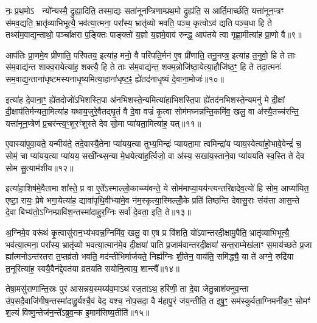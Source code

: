 नः॒ प्र॒थ॒मो\-ऽ  न्यो᳚न्यस्मै॒ द्रुह्या॒दिति॒ तस्मा॒द्यः सता॑नूनप्त्रिणाम्प्रथ॒मो द्रुह्य॑ति॒ स आर्ति॒मार्च्छ॑ति॒ यत्ता॑नून॒प्त्रꣳ स॑मव॒द्यति॒ भ्रातृ॑व्याभिभूत्यै॒ भव॑त्या॒त्मना॒ परा᳚स्य॒ भ्रातृ॑व्यो भवति॒ पञ्च॒ कृत्वो\-ऽव॑ द्यति पञ्च॒धा हि ते तथ्स॑म॒वाद्य॒न्ताथो॒ पञ्चा᳚क्षरा प॒ङ्क्तिः पाङ्क्तो॑ य॒ज्ञो य॒ज्ञमे॒वाव॑ रुन्द्ध॒ आप॑तये त्वा गृह्णा॒मीत्या॑ह प्रा॒णो वै॥९॥

आप॑तिः प्रा॒णमे॒व प्री॑णाति॒ परि॑पतय॒ इत्या॑ह॒ मनो॒ वै परि॑पति॒र्मन॑ ए॒व प्री॑णाति॒ तनू॒नप्त्र॒ इत्या॑ह त॒नुवो॒ हि ते ताः स॑म॒वाद्य॑न्त शाक्व॒रायेत्या॑ह॒ शक्त्यै॒ हि ते ताः स॑म॒वाद्य॑न्त॒ शक्म॒न्नोजि॑ष्ठा॒येत्या॒हौजि॑ष्ठ॒ꣳ॒ हि ते तदा॒त्मनः॑ सम॒वाद्य॒न्ताना॑धृष्टमस्यनाधृ॒ष्यमित्या॒हाना॑धृष्ट॒ꣴ॒ ह्ये॑तद॑नाधृ॒ष्यं दे॒वाना॒मोजः॑॥१०॥

इत्या॑ह दे॒वाना॒ꣳ॒ ह्ये॑तदोजो॑\-ऽभिशस्ति॒पा अ॑नभिशस्ते॒न्यमित्या॑हाभिशस्ति॒पा ह्ये॑तद॑नभिशस्ते॒न्यमनु॑ मे दी॒क्षां दी॒क्षाप॑तिर्मन्यता॒मित्या॑ह यथाय॒जुरे॒वैतद्घृ॒तं वै दे॒वा वज्रं॑ कृ॒त्वा सोम॑मघ्नन्नन्ति॒कमि॑व॒ खलु॒ वा अ॑स्यै॒तच्च॑रन्ति॒ यत्ता॑नून॒प्त्रेण॑ प्र॒चर॑न्त्य॒ꣳ॒शुरꣳ॑शुस्ते देव सो॒मा प्या॑यता॒मित्या॑ह॒ यत्॥११॥

ए॒वास्या॑पुवा॒यते॒ यन्मीय॑ते॒ तदे॒वास्यै॒तेना प्या॑यय॒त्या तुभ्य॒मिन्द्रः॑ प्यायता॒मा त्वमिन्द्रा॑य प्याय॒स्वेत्या॑हो॒भावे॒वेन्द्रं॑ च॒ सोमं॒ चा प्या॑यय॒त्या प्या॑यय॒ सखी᳚न्थ्स॒न्या मे॒धयेत्या॑ह॒र्त्विजो॒ वा अ॑स्य॒ सखा॑य॒स्ताने॒वा प्या॑ययति स्व॒स्ति ते॑ देव सोम सु॒त्याम॑शीय॥१२॥

इत्या॑हा॒शिष॑मे॒वैतामा शा᳚स्ते॒ प्र वा ए॒ते᳚\-ऽस्माल्लो॒काच्च्य॑वन्ते॒ ये सोम॑माप्या॒यय॑न्त्यन्तरिक्षदेव॒त्यो॑ हि सोम॒ आप्या॑यित॒ एष्टा॒ रायः॒ प्रेषे भगा॒येत्या॑ह॒ द्यावा॑पृथि॒वीभ्या॑मे॒व न॑म॒स्कृत्या॒स्मिल्लोँ॒के प्रति॑ तिष्ठन्ति देवासु॒राः संय॑त्ता आस॒न्ते दे॒वा बिभ्य॑तो॒\-ऽग्निम्प्रावि॑श॒न्तस्मा॑दाहुर॒ग्निः सर्वा॑ दे॒वता॒ इति॒ ते॥१३॥

अ॒ग्निमे॒व वरू॑थं कृ॒त्वासु॑रान॒भ्य॑भवन्न॒ग्निमि॑व॒ खलु॒ वा ए॒ष प्र वि॑शति॒ यो॑\-ऽवान्तरदी॒क्षामु॒पैति॒ भ्रातृ॑व्याभिभूत्यै॒ भव॑त्या॒त्मना॒ परा᳚स्य॒ भ्रातृ॑व्यो भवत्या॒त्मान॑मे॒व दी॒क्षया॑ पाति प्र॒जाम॑वान्तरदी॒क्षया॑ सन्त॒राम्मेख॑लाꣳ स॒माय॑च्छते प्र॒जा ह्या᳚त्मनो\-ऽन्त॑रतरा त॒प्तव्र॑तो भवति॒ मद॑न्तीभिर्मार्जयते॒ निर्\mbox{}ह्य॑ग्निः शी॒तेन॒ वाय॑ति॒ समि॑द्ध्यै॒ या ते॑ अग्ने॒ रुद्रि॑या त॒नूरित्या॑ह॒ स्वयै॒वैन॑द्दे॒वत॑या व्रतयति सयोनि॒त्वाय॒ शान्त्यै᳚॥१४॥

{\anuvakamend[{यो वा ओज॑ आह॒ यद॑शी॒येति॒ ते᳚\-ऽग्न॒ एका॑दश च॥२॥}]}

तेषा॒मसु॑राणान्ति॒स्रः पुर॑ आसन्नय॒स्मय्य॑व॒मा\-ऽथ॑ रज॒ता\-ऽथ॒ हरि॑णी॒ ता दे॒वा जेतु॒न्नाश॑क्नुव॒न्ता उ॑प॒सदै॒वाजि॑गीष॒न्तस्मा॑दाहु॒र्यश्चै॒वं वेद॒ यश्च॒ नोप॒सदा॒ वै म॑हापु॒रं ज॑य॒न्तीति॒ त इषु॒ꣳ॒ सम॑स्कुर्वता॒ग्निमनी॑क॒ꣳ॒ सोमꣳ॑ श॒ल्यं विष्णु॒न्तेज॑न॒न्ते᳚\-ऽब्रुव॒न्क इ॒माम॑सिष्य॒तीति॑॥१५॥

